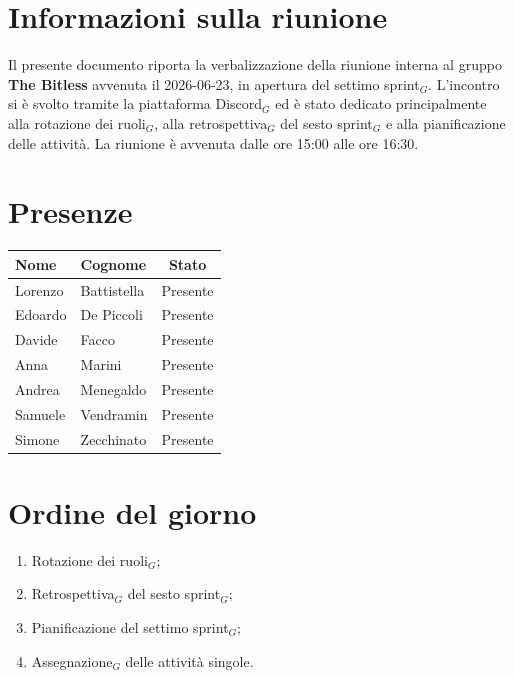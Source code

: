 \documentclass[a4paper, 10pt, colorlinks=true, linkcolor=black, urlcolor=blue, citecolor=blue, hidelinks]{article}
\begin{document}
\newcommand{\titolo}{Verbale interno}
\newcommand{\dataverbale}{2026-06-23}
\newcommand{\dataversione}{2026-06-25}
\newcommand{\versione}{1.0.0}
\newcommand{\stato}{Approvato}
\newcommand{\destinatari}{The Bitless, prof. Tullio Vardanega, prof. Riccardo Cardin}
\def\templatedir{../../../../templates}

\begin{titlepage}

\end{titlepage}

\newpage
\tableofcontents

\newpage
{}
\section{Informazioni sulla riunione}
Il presente documento riporta la verbalizzazione della riunione interna al gruppo \textbf{The Bitless} avvenuta il \dataverbale{}, in apertura del settimo sprint$_G$. L'incontro si è svolto tramite la piattaforma Discord$_G$ ed è stato dedicato principalmente alla rotazione dei ruoli$_G$, alla retrospettiva$_G$ del sesto sprint$_G$ e alla pianificazione delle attività. La riunione è avvenuta dalle ore 15:00 alle ore 16:30. \\

\section{Presenze}
\begin{center}
\begin{tabular}{|l|l|c|}
\hline
\textbf{Nome} & \textbf{Cognome} & \textbf{Stato} \\
\hline
Lorenzo & Battistella & Presente \\
Edoardo & De Piccoli & Presente \\
Davide & Facco & Presente \\
Anna & Marini & Presente \\
Andrea & Menegaldo & Presente \\
Samuele & Vendramin & Presente \\
Simone & Zecchinato & Presente \\
\hline
\end{tabular}
\end{center}

\section{Ordine del giorno}
\begin{enumerate}
    \item Rotazione dei ruoli$_G$;
    \item Retrospettiva$_G$ del sesto sprint$_G$;
    \item Pianificazione del settimo sprint$_G$;
    \item Assegnazione$_G$ delle attività singole.
\end{enumerate}
\end{document}
